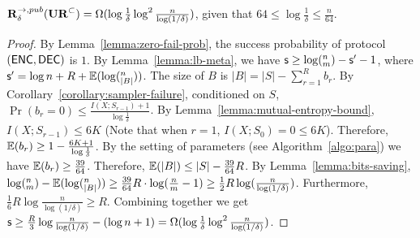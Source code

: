 \begin{theorem}
  $\mathbf{R}^{\rightarrow,pub}_\delta(\mathbf{UR}^\subset) = \Omega(\log \frac{1}{\delta}\log^2 \frac{n}{\log (1/\delta)} )$, given that $64 \le \log \frac{1}{\delta} \le \frac{n}{64}$.
\end{theorem}

\begin{proof}
  By Lemma~\ref{lemma:zero-fail-prob}, the success probability of protocol $(\textsf{ENC},\textsf{DEC})$ is $1$. 
  By Lemma~\ref{lemma:lb-meta}, we have $\textsf{s}\ge \log (^n_m) - \textsf{s}' -1$, where $\textsf{s}'=\log n + R+ \operatorname*{\mathbb{E}}(\log (^n_{|B|}))$. 
  The size of $B$ is $|B|=|S|-\sum_{r=1}^{R}{b_r}$.
  By Corollary~\ref{corollary:sampler-failure}, conditioned on $S$, $\Pr(b_r=0)\le \frac{I(X;S_{r-1})+1}{\log\frac{1}{\delta}}$. 
  By Lemma~\ref{lemma:mutual-entropy-bound}, $I(X;S_{r-1})\le 6K$ (Note that when $r=1$, $I(X;S_0)=0\le 6K$). 
  Therefore, $\operatorname*{\mathbb{E}}(b_r)\ge 1-\frac{6K+1}{\log\frac{1}{\delta}}$.
  By the setting of parameters (see Algorithm~\ref{algo:para}) we have $\operatorname*{\mathbb{E}}(b_r)\ge \frac{39}{64}$. Therefore, $\operatorname*{\mathbb{E}}(|B|)\le |S|-\frac{39}{64}R$. 
  By Lemma~\ref{lemma:bits-saving}, $\log (^n_m)-\operatorname*{\mathbb{E}}(\log (^n_{|B|}))\ge \frac{39}{64}R\cdot \log (\frac{n}{m}-1) \ge \frac{1}{2}R\log (\frac{n}{\log(1/\delta)})$. 
  Furthermore, $\frac{1}{6}R\log \frac{n}{\log (1/\delta)} \ge R$.
  Combining together we get $\textsf{s} \ge \frac{R}{3}\log \frac{n}{\log(1/\delta)} -(\log n + 1)  =\Omega(\log \frac{1}{\delta}\log^2 \frac{n}{\log (1/\delta)} )$.
\end{proof}